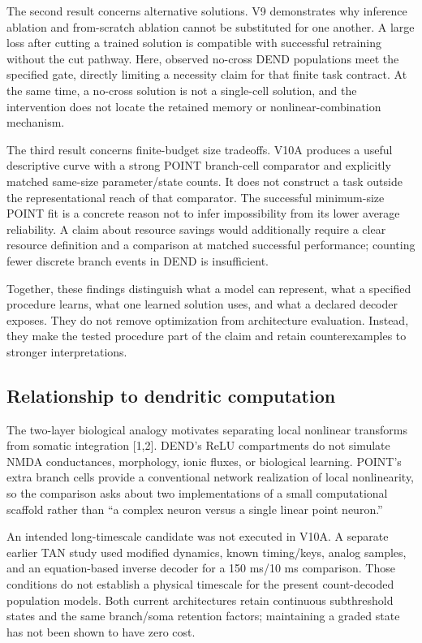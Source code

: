 \documentclass[
  10pt,
]{article}
\begin{document}
The second result concerns alternative solutions. V9 demonstrates why
inference ablation and from-scratch ablation cannot be substituted for
one another. A large loss after cutting a trained solution is compatible
with successful retraining without the cut pathway. Here, observed
no-cross DEND populations meet the specified gate, directly limiting a
necessity claim for that finite task contract. At the same time, a
no-cross solution is not a single-cell solution, and the intervention
does not locate the retained memory or nonlinear-combination mechanism.

The third result concerns finite-budget size tradeoffs. V10A produces a
useful descriptive curve with a strong POINT branch-cell comparator and
explicitly matched same-size parameter/state counts. It does not
construct a task outside the representational reach of that comparator.
The successful minimum-size POINT fit is a concrete reason not to infer
impossibility from its lower average reliability. A claim about resource
savings would additionally require a clear resource definition and a
comparison at matched successful performance; counting fewer discrete
branch events in DEND is insufficient.

Together, these findings distinguish what a model can represent, what a
specified procedure learns, what one learned solution uses, and what a
declared decoder exposes. They do not remove optimization from
architecture evaluation. Instead, they make the tested procedure part of
the claim and retain counterexamples to stronger interpretations.

\subsection{Relationship to dendritic
computation}\label{relationship-to-dendritic-computation}

The two-layer biological analogy motivates separating local nonlinear
transforms from somatic integration {[}1,2{]}. DEND's ReLU compartments
do not simulate NMDA conductances, morphology, ionic fluxes, or
biological learning. POINT's extra branch cells provide a conventional
network realization of local nonlinearity, so the comparison asks about
two implementations of a small computational scaffold rather than ``a
complex neuron versus a single linear point neuron.''

An intended long-timescale candidate was not executed in V10A. A
separate earlier TAN study used modified dynamics, known timing/keys,
analog samples, and an equation-based inverse decoder for a 150 ms/10 ms
comparison. Those conditions do not establish a physical timescale for
the present count-decoded population models. Both current architectures
retain continuous subthreshold states and the same branch/soma retention
factors; maintaining a graded state has not been shown to have zero
cost.
\end{document}
